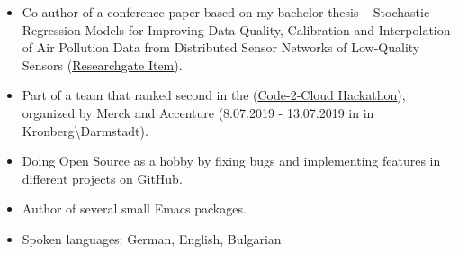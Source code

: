 \documentclass[letterpaper,10pt]{article}
\newcommand{\resumeSubHeadingListStart}{\begin{itemize}[leftmargin=*]}
\newcommand{\resumeSubHeadingListEnd}{\end{itemize}}
\begin{document}
\resumeSubHeadingListStart
\item Co-author of a conference paper based on my bachelor thesis -- Stochastic Regression Models for Improving Data Quality, Calibration and Interpolation of Air Pollution Data from Distributed Sensor Networks of Low-Quality Sensors (\href{https://www.researchgate.net/publication/331131928_Stochastische_Regressionsmodelle_zur_Verbesserung_der_Datenqualitat_Kalibrierung_und_Interpolation_von_Umwelt-und_Luftdaten_in_verteilten_Messnetzen_aus_Low-Cost_Sensoren}{\color{blue}\underline{Researchgate Item}}).
\item Part of a team that ranked second in the (\href{https://www.meetup.com/Darmstadt-InnovationM-Round-Table/events/262603767/}{\color{blue}\underline{Code-2-Cloud Hackathon}}), organized by Merck and Accenture (8.07.2019 - 13.07.2019 in in Kronberg\textbackslash Darmstadt).
\item Doing Open Source as a hobby by fixing bugs and implementing features in different projects on GitHub.
\item Author of several small Emacs packages.
\item Spoken languages: German, English, Bulgarian
  \resumeSubHeadingListEnd
  
\end{document}
